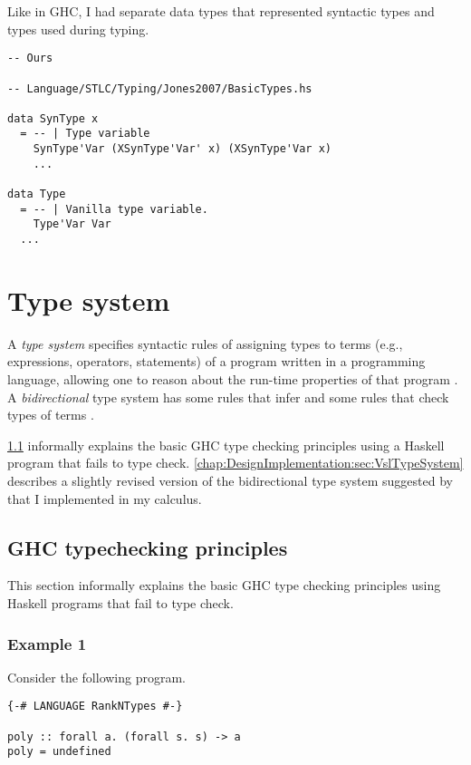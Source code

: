 Like in GHC, I had separate data types that represented syntactic types and types used during typing.

\begin{verbatim}
-- Ours

-- Language/STLC/Typing/Jones2007/BasicTypes.hs

data SynType x
  = -- | Type variable
    SynType'Var (XSynType'Var' x) (XSynType'Var x)
    ...

data Type
  = -- | Vanilla type variable.
    Type'Var Var
  ...
\end{verbatim}

\section{Type system}

A \textit{type system} specifies syntactic rules of assigning types to terms (e.g., expressions, operators, statements) of a program written in a programming language, allowing one to reason about the run-time properties of that program \cite{pierce-types-2002}.
A \textit{bidirectional} type system has some rules that infer and some rules that check types of terms \cite{dunfield-bidirectional-2020}.

\cref{chap:DesignImplementation:sec:GhcTypecheckingError} informally explains the basic GHC type checking principles using a Haskell program that fails to type check.
\cref{chap:DesignImplementation:sec:VslTypeSystem} describes a slightly revised version of the bidirectional type system suggested by \citeauthor{jones-practical-2007} \cite[Sec. 4.7]{jones-practical-2007} that I implemented in my calculus.


\subsection{GHC typechecking principles}
\label{chap:DesignImplementation:sec:GhcTypecheckingError}

This section informally explains the basic GHC type checking principles using Haskell programs that fail to type check.

\subsubsection{Example 1}

Consider the following program.

\begin{verbatim}
{-# LANGUAGE RankNTypes #-}

poly :: forall a. (forall s. s) -> a
poly = undefined
\end{verbatim}

